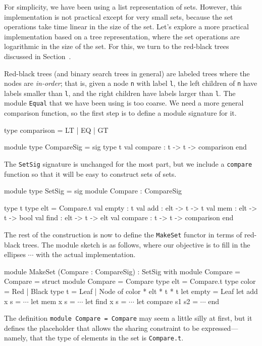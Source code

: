 For simplicity, we have been using a list representation of sets.
However, this implementation is not practical except for very small
sets, because the set operations take time linear in the size of the
set.  Let's explore a more practical implementation based on a tree
representation, where the set operations are logarithmic in the size
of the set.  For this, we turn to the red-black trees discussed in
Section~.

Red-black trees (and binary search trees in general) are labeled trees
where the nodes are \emph{in-order}; that is, given a node \hbox{\lstinline/n/}
with label \hbox{\lstinline/l/}, the left children of \hbox{\lstinline/n/} have labels smaller
than \hbox{\lstinline/l/}, and the right children have labels larger than \hbox{\lstinline/l/}.
The module \hbox{\lstinline$Equal$} that we have been using is too
coarse.  We need a more general comparison function, so the first step
is to define a module signature for it.

\begin{ocaml}
type comparison = LT | EQ | GT

module type CompareSig = sig
   type t
   val compare : t -> t -> comparison
end
\end{ocaml}
%
The \hbox{\lstinline$SetSig$} signature is unchanged for the most part, but
we include a \hbox{\lstinline$compare$} function so that it will be easy to
construct sets of sets.

\begin{ocaml}
module type SetSig = sig
   module Compare : CompareSig

   type t
   type elt = Compare.t
   val empty   : t
   val add     : elt -> t -> t
   val mem     : elt -> t -> bool
   val find    : elt -> t -> elt
   val compare : t -> t -> comparison
end
\end{ocaml}
%
The rest of the construction is now to define
the \hbox{\lstinline$MakeSet$} functor in terms of red-black trees.
The module sketch is as follows, where our objective is to fill in the
ellipses $\cdots$ with the actual implementation.

\begin{ocaml}
module MakeSet (Compare : CompareSig)
 : SetSig with module Compare = Compare =
struct
    module Compare = Compare
    type elt = Compare.t
    type color = Red | Black
    type t = Leaf | Node of color * elt * t * t
    let empty = Leaf
    let add x s = $\cdots$
    let mem x s = $\cdots$
    let find x s = $\cdots$
    let compare s1 s2 = $\cdots$
end
\end{ocaml}
%
The definition \hbox{\lstinline$module Compare = Compare$} may seem a
little silly at first, but it defines the placeholder that allows the
sharing constraint to be expressed---namely, that the type of elements
in the set is \hbox{\lstinline$Compare.t$}.

